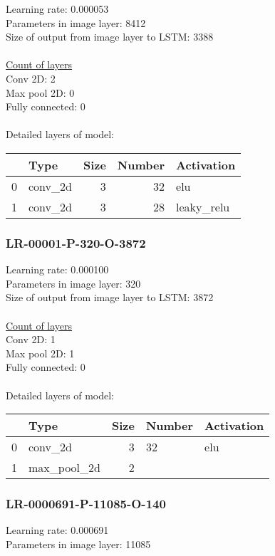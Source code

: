 Learning rate: 0.000053
\\Parameters in image layer: 8412
\\Size of output from image layer to LSTM: 3388
\\\\\underline{Count of layers} 
\\Conv 2D:           2\\Max pool 2D:      0\\Fully connected:  0
\\\\Detailed layers of model: \\\begin{tabular}{rlrrl}
\hline
    & Type    &   Size &   Number & Activation   \\
\hline
  0 & conv\_2d &      3 &       32 & elu          \\
  1 & conv\_2d &      3 &       28 & leaky\_relu   \\
\hline
\end{tabular}\subsubsection*{LR-00001-P-320-O-3872}
Learning rate: 0.000100
\\Parameters in image layer: 320
\\Size of output from image layer to LSTM: 3872
\\\\\underline{Count of layers} 
\\Conv 2D:           1\\Max pool 2D:      1\\Fully connected:  0
\\\\Detailed layers of model: \\\begin{tabular}{rlrll}
\hline
    & Type        &   Size & Number   & Activation   \\
\hline
  0 & conv\_2d     &      3 & 32       & elu          \\
  1 & max\_pool\_2d &      2 &          &              \\
\hline
\end{tabular}\subsubsection*{LR-0000691-P-11085-O-140}
Learning rate: 0.000691
\\Parameters in image layer: 11085
